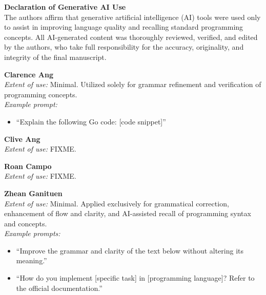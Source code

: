 \documentclass{article}
\begin{document}
\vfill
{\footnotesize
\noindent\textbf{Declaration of Generative AI Use} \\
The authors affirm that generative artificial intelligence (AI) tools were used only to assist in improving language quality and recalling standard programming concepts. All AI-generated content was thoroughly reviewed, verified, and edited by the authors, who take full responsibility for the accuracy, originality, and integrity of the final manuscript.

\medskip
\noindent\textbf{Clarence Ang} \\
\textit{Extent of use:} Minimal. Utilized solely for grammar refinement and verification of programming concepts. \\
\textit{Example prompt:}
\begin{itemize}
    \item ``Explain the following Go code: [code snippet]''
\end{itemize}

\noindent\textbf{Clive Ang} \\
\textit{Extent of use:} FIXME.

\noindent\textbf{Roan Campo} \\
\textit{Extent of use:} FIXME.

\noindent\textbf{Zhean Ganituen} \\
\textit{Extent of use:} Minimal. Applied exclusively for grammatical correction, enhancement of flow and clarity, and AI-assisted recall of programming syntax and concepts. \\
\textit{Example prompts:}
\begin{itemize}
    \item ``Improve the grammar and clarity of the text below without altering its meaning.'' 
    \item ``How do you implement [specific task] in [programming language]? Refer to the official documentation.''
\end{itemize}
\par}
\end{document}
